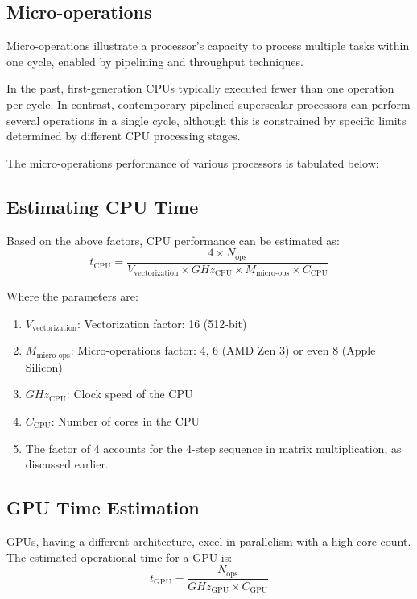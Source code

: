 \clearpage

\subsection{Micro-operations}
Micro-operations illustrate a processor's capacity to process multiple tasks within one cycle, enabled by pipelining and throughput techniques.

In the past, first-generation CPUs typically executed fewer than one operation per cycle. In contrast, contemporary pipelined superscalar processors can perform several operations in a single cycle, although this is constrained by specific limits determined by different CPU processing stages.

The micro-operations performance of various processors is tabulated below:

\subsection{Estimating CPU Time}
Based on the above factors, CPU performance can be estimated as:
\begin{equation}
    t_{\text{CPU}} = \frac{4 \times N_{\text{ops}}}{{V_{\text{vectorization}}} \times GHz_{\text{CPU}} \times M_{\text{micro-ops}} \times C_{\text{CPU}}}
\end{equation}

Where the parameters are:
\begin{enumerate}
    \item $V_{\text{vectorization}}$: Vectorization factor: 16 (512-bit)
    \item $M_{\text{micro-ops}}$: Micro-operations factor: 4, 6 (AMD Zen 3) or even 8 (Apple Silicon)
    \item $GHz_{\text{CPU}}$: Clock speed of the CPU
    \item $C_{\text{CPU}}$: Number of cores in the CPU
    \item The factor of 4 accounts for the 4-step sequence in matrix multiplication, as discussed earlier.
\end{enumerate}

\subsection{GPU Time Estimation}
GPUs, having a different architecture, excel in parallelism with a high core count. The estimated operational time for a GPU is:
\begin{equation}
    t_{\text{GPU}} = \frac{N_{\text{ops}}}{GHz_{\text{GPU}} \times C_{\text{GPU}}}
\end{equation}

